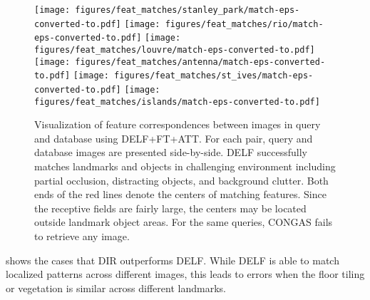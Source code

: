 \documentclass[10pt,twocolumn,letterpaper]{article}
\begin{document}
\begin{figure*}[t]
\begin{center}
   \texttt{[image: figures/feat\_matches/stanley\_park/match-eps-converted-to.pdf]}
   \texttt{[image: figures/feat\_matches/rio/match-eps-converted-to.pdf]}
   \texttt{[image: figures/feat\_matches/louvre/match-eps-converted-to.pdf]} \\
   \vspace{0.03cm}      
   \texttt{[image: figures/feat\_matches/antenna/match-eps-converted-to.pdf]} 
   \texttt{[image: figures/feat\_matches/st\_ives/match-eps-converted-to.pdf]}
   \texttt{[image: figures/feat\_matches/islands/match-eps-converted-to.pdf]} \\
   \vspace{-0.5cm}   
\end{center}
	\caption{Visualization of feature correspondences between images in query and database using DELF+FT+ATT.  For each pair, query and database images are presented side-by-side.  DELF successfully matches landmarks and objects in challenging environment including partial occlusion, distracting objects, and background clutter.  Both ends of the red lines denote the centers of matching features.  Since the receptive fields are fairly large, the centers may be located outside landmark object areas.  For the same queries, CONGAS fails to retrieve any image.}
	\vspace{-0.2cm}
\label{fig:feat_matches}
\end{figure*}
 shows the cases that DIR outperforms DELF.
While DELF is able to match localized patterns across different images, this leads to errors when the floor tiling or vegetation is similar across different landmarks.
\end{document}
